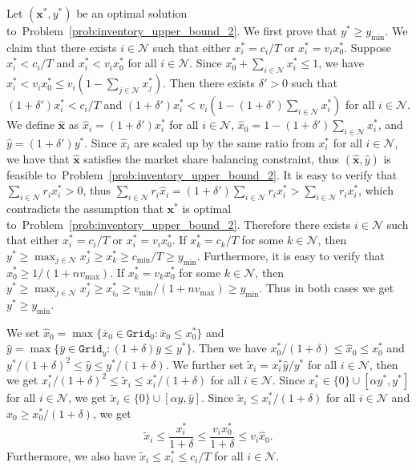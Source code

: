 \documentclass[mnsc,non-blindrev]{informs3}
\theoremstyle{definition}
\begin{document}
\begin{appendices}{\Large{}}
Let $(\bm{x}^*,y^*)$ be an optimal solution to~Problem~\eqref{prob:inventory_upper_bound_2}. We first prove that $y^*\geq y_{\min}$. We claim that there exists $i\in\mathcal{N}$ such that either $x_i^*=c_i/T$ or $x_i^*=v_ix_0^*$. Suppose $x_i^*<c_i/T$ and $x_i^*<v_ix_0^*$ for all $i\in\mathcal{N}$. Since $x_0^*+\sum_{i\in\mathcal{N}}x_i^*\leq 1$, we have $x_i^*<v_ix_0^*\leq v_i(1-\sum_{j\in\mathcal{N}}x_j^*)$. Then there exists $\delta'>0$ such that $(1+\delta')x_i^*<c_i/T$ and \mbox{$(1+\delta')x_i^*<v_i(1-(1+\delta')\sum_{i\in\mathcal{N}}x_i^*)$} for all $i\in\mathcal{N}$. We define $\hat{\bm{x}}$ as $\hat{x}_i=(1+\delta')x_i^*$ for all $i\in\mathcal{N}$, $\hat{x}_0=1-(1+\delta')\sum_{i\in\mathcal{N}}x_i^*$, and $\hat{y}=(1+\delta')y^*$. Since $\hat{x}_i$ are scaled up by the same ratio from $x_i^*$ for all $i\in\mathcal{N}$, we have that $\hat{\bm{x}}$ satisfies the market share balancing constraint, thus $(\hat{\bm{x}},\hat{y})$ is feasible to~Problem~\eqref{prob:inventory_upper_bound_2}. It is easy to verify that $\sum_{i\in\mathcal{N}}r_ix_i^*>0$, thus $\sum_{i\in\mathcal{N}}r_i\hat{x}_i=(1+\delta')\sum_{i\in\mathcal{N}}r_ix_i^*>\sum_{i\in\mathcal{N}}r_ix_i^*$, which contradicts the assumption that $\bm{x}^*$ is optimal to~Problem~\eqref{prob:inventory_upper_bound_2}. Therefore there exists $i\in\mathcal{N}$ such that either $x^*_i=c_i/T$ or $x^*_i=v_ix_0^*$. If $x_{k}^*=c_{k}/T$ for some $k\in\mathcal{N}$, then $y^*\geq\max_{j\in\mathcal{N}}x_j^*\geq x_{k}^*\geq c_{\min}/T\geq y_{\min}$. Furthermore, it is easy to verify that $x_0^*\geq 1/(1+nv_{\max})$. If $x_{k}^*=v_{k}x_0^*$ for some $k\in\mathcal{N}$, then \mbox{$y^*\geq \max_{j\in\mathcal{N}}x_j^*\geq x_{i_0}^*\geq v_{\min}/(1+nv_{\max})\geq y_{\min}$.} Thus in both cases we get $y^*\geq y_{\min}$.

We set $\hat{x}_0=\max\{\bar{x}_0\in\texttt{Grid}_0:\bar{x}_0\leq x_0^*\}$ and $\hat{y}=\max\{\bar{y}\in\texttt{Grid}_y:(1+\delta)\bar{y}\leq y^*\}$. Then we have $x_0^*/(1+\delta)\leq\hat{x}_0\leq x_0^*$ and $y^*/(1+\delta)^2\leq \hat{y}\leq y^*/(1+\delta)$. We further set $\tilde{x}_i=x_i^*\hat{y}/y^*$ for all $i\in\mathcal{N}$, then we get $x_i^*/(1+\delta)^2\leq\tilde{x}_i\leq x_i^*/(1+\delta)$ for all $i\in\mathcal{N}$. Since $x_i^*\in\{0\}\cup[\alpha y^*,y^*]$ for all $i\in\mathcal{N}$, we get $\tilde{x}_i\in\{0\}\cup[\alpha\hat{y},\hat{y}]$. Since $\tilde{x}_i\leq x_i^*/(1+\delta)$ for all $i\in\mathcal{N}$ and $\hat{x}_0\geq x_0^*/(1+\delta)$, we get $$\tilde{x}_i\leq \dfrac{x_i^*}{1+\delta}\leq \dfrac{v_ix_0^*}{1+\delta}\leq v_i\hat{x}_0.$$ 
Furthermore, we also have $\tilde{x}_i\leq x_i^*\leq c_i/T$ for all $i\in\mathcal{N}$.


\end{appendices}
\end{document}
